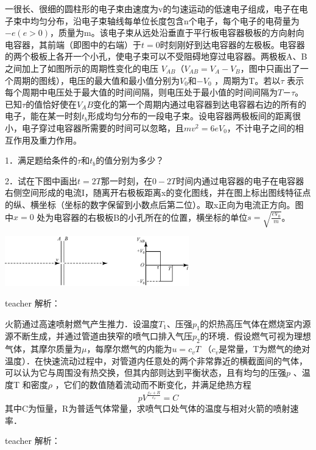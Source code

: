 \begin{example}
	一很长、很细的圆柱形的电子束由速度为v的匀速运动的低速电子组成，电子在电子束中均匀分布，沿电子束轴线每单位长度包含n个电子，每个电子的电荷量为$-e(e>0)$，质量为m。该电子束从远处沿垂直于平行板电容器极板的方向射向电容器，其前端（即图中的右端）于$t=0$时刻刚好到达电容器的左极板。电容器的两个极板上各开一个小孔，使电子束可以不受阻碍地穿过电容器。两极板A、B之间加上了如图所示的周期性变化的电压 $V_{AB}$（$V_{AB}=V_A-V_B$，图中只画出了一个周期的图线），电压的最大值和最小值分别为$V_0$和$-V_0$ ，周期为T。若以$\tau$ 表示每个周期中电压处于最大值的时间间隔，则电压处于最小值的时间间隔为$T－\tau$。已知$\tau$的值恰好使在$V_AB$变化的第一个周期内通过电容器到达电容器右边的所有的电子，能在某一时刻$t_b$形成均匀分布的一段电子束。设电容器两极板间的距离很小，电子穿过电容器所需要的时间可以忽略，且$mv^2=6eV_0$，不计电子之间的相互作用及重力作用。
 
	1．满足题给条件的$\tau$和$t_b$的值分别为多少？
	
	2．试在下图中画出$t=2T$那一时刻，在$0-2T$时间内通过电容器的电子在电容器右侧空间形成的电流I，随离开右极板距离x的变化图线，并在图上标出图线特征点的纵、横坐标（坐标的数字保留到小数点后第二位）。取x正向为电流正方向。图中$x=0$ 处为电容器的右极板B的小孔所在的位置，横坐标的单位$s=\sqrt{\frac{eV_0}{m}}$。
\begin{center}
\includegraphics[width = 0.6\textwidth]{images/problem-3.pdf} 
\end{center}
\begin{taggedblock}{teacher}
解析：
\end{taggedblock}
\end{example}

\begin{example}
	火箭通过高速喷射燃气产生推力．设温度$T_1$、压强$p_1$的炽热高压气体在燃烧室内源源不断生成，并通过管道由狭窄的喷气口排入气压$p_2$的环境．假设燃气可视为理想气体，其摩尔质量为$\mu$，每摩尔燃气的内能为$u=c_v T$ （$c_v$是常量，T为燃气的绝对温度）．在快速流动过程中，对管道内任意处的两个非常靠近的横截面间的气体，可以认为它与周围没有热交换，但其内部则达到平衡状态，且有均匀的压强$p$ 、温度T 和密度$\rho$ ，它们的数值随着流动而不断变化，并满足绝热方程
	\[pV^{\frac{c_v+R}{c_v}}=C\] 
	其中C为恒量，R为普适气体常量，求喷气口处气体的温度与相对火箭的喷射速率．
\begin{taggedblock}{teacher}
解析：
\end{taggedblock}
\end{example}

